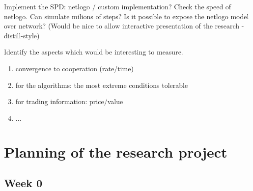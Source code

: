 \documentclass[english]{article}
\begin{document}
Implement the SPD: netlogo / custom implementation?
Check the speed of netlogo. Can simulate milions of steps?
Is it possible to expose the netlogo model over network? (Would be nice to allow interactive presentation of the research - distill-style)

Identify the aspects which would be interesting to measure.
\begin{enumerate}
\item convergence to cooperation (rate/time)
\item for the algorithms: the most extreme conditions tolerable
\item for trading information: price/value
\item ...
\end{enumerate}



\section*{Planning of the research project}

\subsection*{Week 0}
\end{document}
